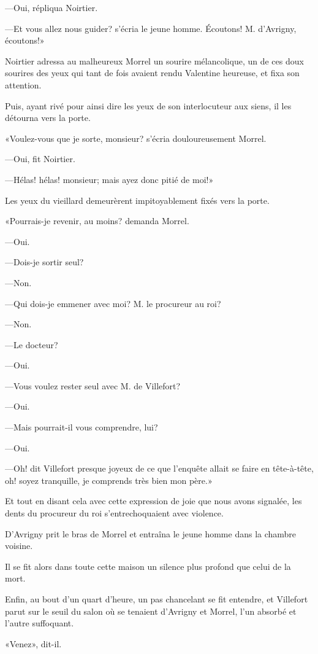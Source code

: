 —Oui, répliqua Noirtier. 

—Et vous allez nous guider? s'écria le jeune homme. Écoutons! M. d'Avrigny, écoutons!» 

Noirtier adressa au malheureux Morrel un sourire mélancolique, un de ces doux sourires des yeux qui tant de fois avaient rendu Valentine heureuse, et fixa son attention. 

Puis, ayant rivé pour ainsi dire les yeux de son interlocuteur aux siens, il les détourna vers la porte. 

«Voulez-vous que je sorte, monsieur? s'écria douloureusement Morrel. 

—Oui, fit Noirtier. 

—Hélas! hélas! monsieur; mais ayez donc pitié de moi!» 

Les yeux du vieillard demeurèrent impitoyablement fixés vers la porte. 

«Pourrais-je revenir, au moins? demanda Morrel. 

—Oui. 

—Dois-je sortir seul? 

—Non. 

—Qui dois-je emmener avec moi? M. le procureur au roi? 

—Non. 

—Le docteur? 

—Oui. 

—Vous voulez rester seul avec M. de Villefort? 

—Oui. 

—Mais pourrait-il vous comprendre, lui? 

—Oui. 

—Oh! dit Villefort presque joyeux de ce que l'enquête allait se faire en tête-à-tête, oh! soyez tranquille, je comprends très bien mon père.» 

Et tout en disant cela avec cette expression de joie que nous avons signalée, les dents du procureur du roi s'entrechoquaient avec violence. 

D'Avrigny prit le bras de Morrel et entraîna le jeune homme dans la chambre voisine. 

Il se fit alors dans toute cette maison un silence plus profond que celui de la mort. 

Enfin, au bout d'un quart d'heure, un pas chancelant se fit entendre, et Villefort parut sur le seuil du salon où se tenaient d'Avrigny et Morrel, l'un absorbé et l'autre suffoquant. 

«Venez», dit-il. 

